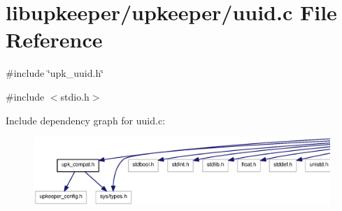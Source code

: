 \section{libupkeeper/upkeeper/uuid.c File Reference}
\label{upkeeper_2uuid_8c}
{\ttfamily \#include \char`\"{}upk\_\-uuid.h\char`\"{}}\par
{\ttfamily \#include $<$stdio.h$>$}\par
Include dependency graph for uuid.c:\nopagebreak
\begin{figure}[H]
\begin{center}
\leavevmode
\includegraphics[width=400pt]{upkeeper_2uuid_8c__incl}
\end{center}
\end{figure}
